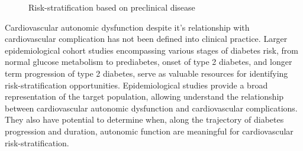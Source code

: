 \documentclass[
  a4paper,
  headsepline=true,
  open=any]{scrbook}
\begin{document}
\begin{figure}

\begin{minipage}[t]{\linewidth}

{\centering 


\caption{Risk-stratification based on preclinical disease}

}

\end{minipage}%

\end{figure}

Cardiovascular autonomic dysfunction despite it's relationship with
cardiovascular complication has not been defined into clinical practice.
Larger epidemiological cohort studies encompassing various stages of
diabetes risk, from normal glucose metabolism to prediabetes, onset of
type 2 diabetes, and longer term progression of type 2 diabetes, serve
as valuable resources for identifying risk-stratification opportunities.
Epidemiological studies provide a broad representation of the target
population, allowing understand the relationship between cardiovascular
autonomic dysfunction and cardiovascular complications. They also have
potential to determine when, along the trajectory of diabetes
progression and duration, autonomic function are meaningful for
cardiovascular risk-stratification.
\end{document}
